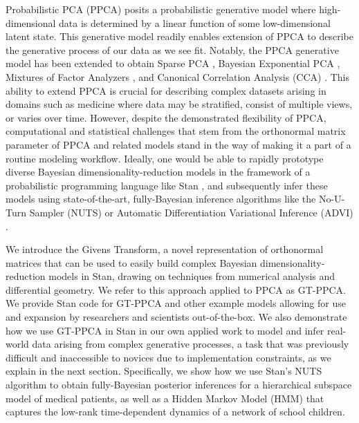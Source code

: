 \documentclass{article}
\begin{document}
Probabilistic PCA (PPCA) \citep{tipping1999probabilistic} posits a probabilistic generative model where high-dimensional data is determined by a linear function of some low-dimensional latent state. This generative model readily enables extension of PPCA to describe the generative process of our data as we see fit. Notably, the PPCA generative model has been extended to obtain Sparse PCA \citep{hoff2009simulation}, Bayesian Exponential PCA \citep{mohamed2009bayesian}, Mixtures of Factor Analyzers \citep{ghahramani1996algorithm}, and Canonical Correlation Analysis (CCA) \citep[chapt.~12.5]{murphy2012machine}. This ability to extend PPCA is crucial for describing complex datasets arising in domains such as medicine where data may be stratified, consist of multiple views, or varies over time. However, despite the demonstrated flexibility of PPCA, computational and statistical challenges that stem from the orthonormal matrix parameter of PPCA and related models stand in the way of making it a part of a routine modeling workflow. Ideally, one would be able to rapidly prototype diverse Bayesian dimensionality-reduction models in the framework of a probabilistic programming language like Stan \citep{carpenter2016stan}, and subsequently infer these models using state-of-the-art, fully-Bayesian inference algorithms like the No-U-Turn Sampler (NUTS) \citep{hoffman2014no} or Automatic Differentiation Variational Inference (ADVI) \citep{kucukelbir2014fully}. 

We introduce the Givens Transform, a novel representation of orthonormal matrices that can be used to easily build complex Bayesian dimensionality-reduction models in Stan, drawing on techniques from numerical analysis and differential geometry. We refer to this approach applied to PPCA as GT-PPCA. We provide Stan code for GT-PPCA and other example models allowing for use and expansion by researchers and scientists out-of-the-box. We also demonstrate how we use GT-PPCA in Stan in our own applied work to model and infer real-world data arising from complex generative processes, a task that was previously difficult and inaccessible to novices due to implementation constraints, as we explain in the next section. Specifically, we show how we use Stan's NUTS algorithm to obtain fully-Bayesian posterior inferences for a hierarchical subspace model of medical patients, as well as a Hidden Markov Model (HMM) that captures the low-rank time-dependent dynamics of a network of school children.
\end{document}

